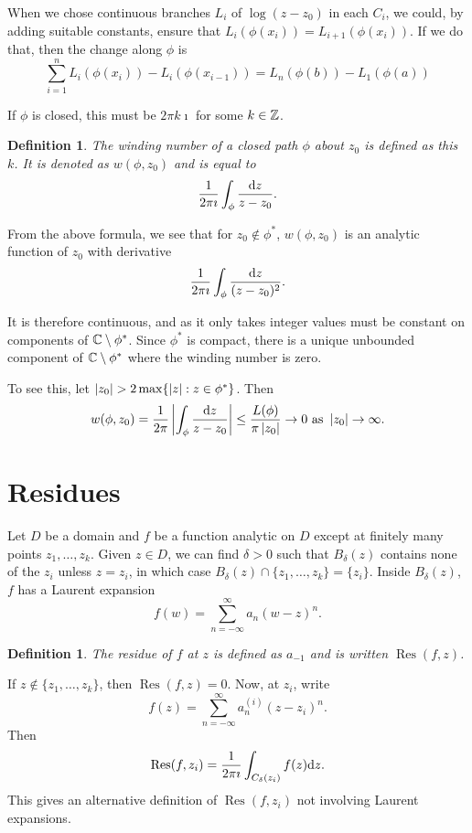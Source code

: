 \documentclass{notes}
\theoremstyle{plain}
\newtheorem{definition}[proposition]{Definition}
\DeclareMathOperator{\Res}{Res}
\begin{document}
When we chose continuous branches $L_i$ of $\log (z-z_0)$ in each $C_i$, we
could, by adding suitable constants, ensure that $L_i(\phi(x_i)) = 
L_{i+1}(\phi(x_i))$.  If we do that, then the change along $\phi$ is
\[
\sum_{i=1}^n L_i(\phi(x_i)) - L_i(\phi(x_{i-1})) = L_n(\phi(b)) - 
L_{1}(\phi(a))
\]

If $\phi$ is closed, this must be $2 \pi k \imath$ for some $k \in \mathbb{Z}$.

\begin{definition}
The winding number%
 of a closed path $\phi$ about $z_0$ is defined as
this $k$.   It is denoted as $w(\phi,z_0)$ and is equal to
\[
\frac{1}{2 \pi \imath} \int_\phi \frac{\mathrm{d} z}{z-z_0}.
\]
\end{definition}

From the above formula, we see that for $z_0 \notin \phi^*$, $w(\phi,z_0)$
is an analytic function of $z_0$ with derivative
\[
\frac{1}{2 \pi \imath} \int_\phi \frac{\mathrm{d} z}{(z-z_0)^2}.
\]

It is therefore continuous, and as it only takes integer values must be
constant on components of $\mathbb{C} \setminus \phi^*$.  Since $\phi^*$ is compact,
there is a unique unbounded component of $\mathbb{C} \setminus \phi^*$ where the
winding number is zero.

To see this, let $\left|z_0\right| > 2 \max \{ \left|z\right| : z \in \phi^* \}$.  Then
\[
w(\phi,z_0) = \frac{1}{2 \pi} \left|\int_\phi \frac{\mathrm{d} z}{z-z_0}\right|
\le \frac{L(\phi)}{\pi \left|z_0\right|} \rightarrow 0 \text{ as } \left|z_0\right|
\rightarrow \infty.
\]

\section{Residues}%

Let $D$ be a domain and $f$ be a function analytic on $D$ except at finitely
many points $z_1, \dots, z_k$.  Given $z \in D$, we can find $\delta > 0$ such
that $B_\delta(z)$ contains none of the $z_i$ unless $z = z_i$, in which case
$B_\delta(z) \cap \{ z_1, \dots, z_k \} = \{ z_i \}$.  Inside $B_\delta(z)$,
$f$ has a Laurent expansion 
\[
f(w) = \sum_{n=-\infty}^\infty a_n (w-z)^n.
\]

\begin{definition}
The residue of $f$ at $z$ is defined as $a_{-1}$ and is written
$\Res (f,z)$.
\end{definition}

If $z \notin \{ z_1, \dots, z_k \}$, then $\Res (f,z) = 0$.
Now, at $z_i$, write
\[
f(z) = \sum_{n=-\infty}^\infty a_n^{(i)} (z-z_i)^n.
\]
Then
\[
\Res (f,z_i) = \frac{1}{2 \pi \imath} \int_{C_\delta(z_i)} f(z) \ud z.
\]
This gives an alternative definition of $\Res (f,z_i)$ not involving Laurent
expansions.
\end{document}
